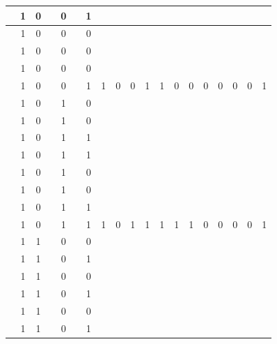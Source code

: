 \begin{table}[!tb]
\begin{tabular}{|c|c|c|c|c|c|c|c|c|c|c|c|c|c|c|c|c|c|c|}
        \rowcolor{yellow!40}  & 1 & 0 &  & 0 &  & 1 &  &  &  &  &  &  &  &  &  &  &  &  \\ \hline
        \rowcolor{yellow!40}  & 1 & 0 &  & 0 &  & 0 &  &  &  &  &  &  &  &  &  &  &  &  \\ \hline
        \rowcolor{yellow!40}  & 1 & 0 &  & 0 &  & 0 &  &  &  &  &  &  &  &  &  &  &  &  \\ \hline
        \rowcolor{yellow!40}  & 1 & 0 &  & 0 &  & 0 &  &  &  &  &  &  &  &  &  &  &  &  \\ \hline
        \rowcolor{yellow!40}  & 1 & 0 &  & 0 &  & 1 & 1 & 0 & 0 & 1 & 1 & 0 & 0 & 0 & 0 & 0 & 0 & 1 \\ \hline
        \rowcolor{gray!40}  & 1 & 0 &  & 1 &  & 0 &  &  &  &  &  &  &  &  &  &  &  &  \\ \hline
        \rowcolor{gray!40}  & 1 & 0 &  & 1 &  & 0 &  &  &  &  &  &  &  &  &  &  &  &  \\ \hline
        \rowcolor{gray!40}  & 1 & 0 &  & 1 &  & 1 &  &  &  &  &  &  &  &  &  &  &  &  \\ \hline
        \rowcolor{gray!40}  & 1 & 0 &  & 1 &  & 1 &  &  &  &  &  &  &  &  &  &  &  &  \\ \hline
        \rowcolor{gray!40}  & 1 & 0 &  & 1 &  & 0 &  &  &  &  &  &  &  &  &  &  &  &  \\ \hline
        \rowcolor{gray!40}  & 1 & 0 &  & 1 &  & 0 &  &  &  &  &  &  &  &  &  &  &  &  \\ \hline
        \rowcolor{gray!40}  & 1 & 0 &  & 1 &  & 1 &  &  &  &  &  &  &  &  &  &  &  &  \\ \hline
        \rowcolor{gray!40}  & 1 & 0 &  & 1 &  & 1 & 1 & 0 & 1 & 1 & 1 & 1 & 1 & 0 & 0 & 0 & 0 & 1 \\ \hline
        \rowcolor{blue!40}  & 1 & 1 &  & 0 &  & 0 &  &  &  &  &  &  &  &  &  &  &  &  \\ \hline
        \rowcolor{blue!40}  & 1 & 1 &  & 0 &  & 1 &  &  &  &  &  &  &  &  &  &  &  &  \\ \hline
        \rowcolor{blue!40}  & 1 & 1 &  & 0 &  & 0 &  &  &  &  &  &  &  &  &  &  &  &  \\ \hline
        \rowcolor{blue!40}  & 1 & 1 &  & 0 &  & 1 &  &  &  &  &  &  &  &  &  &  &  &  \\ \hline
        \rowcolor{blue!40}  & 1 & 1 &  & 0 &  & 0 &  &  &  &  &  &  &  &  &  &  &  &  \\ \hline
        \rowcolor{blue!40}  & 1 & 1 &  & 0 &  & 1 &  &  &  &  &  &  &  &  &  &  &  &  \\ \hline

\end{tabular}
\end{table}

